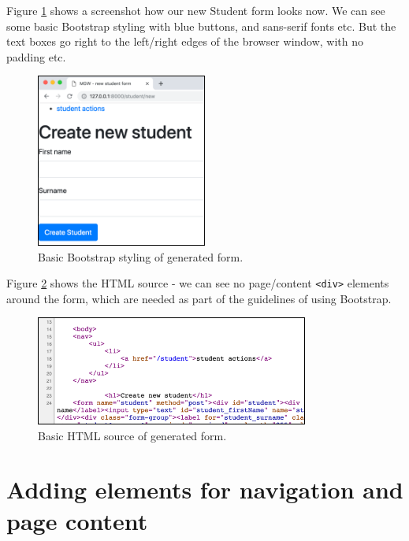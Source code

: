 \documentclass[a4paperpaper,openright]{book}
\begin{document}
Figure \ref{form_bootstrap} shows a screenshot how our new Student form
looks now. We can see some basic Bootstrap styling with blue buttons,
and sans-serif fonts etc. But the text boxes go right to the left/right
edges of the browser window, with no padding etc.

\begin{figure}
\centering
\includegraphics[width=0.5\textwidth,height=\textheight]{./tex2pdf.-8a1528da847c818a/15a6d51f6220970d5520415ccb4864ae58ae9ad9.png}
\caption{Basic Bootstrap styling of generated form.
\label{form_bootstrap}}
\end{figure}

Figure \ref{form_bootstrap_source} shows the HTML source - we can see no
page/content \texttt{\textless{}div\textgreater{}} elements around the
form, which are needed as part of the guidelines of using Bootstrap.

\begin{figure}
\centering
\includegraphics[width=0.8\textwidth,height=\textheight]{./tex2pdf.-8a1528da847c818a/f9087b127b21a746a42bee0755ac2abfb144b89c.png}
\caption{Basic HTML source of generated form.
\label{form_bootstrap_source}}
\end{figure}

\hypertarget{adding-elements-for-navigation-and-page-content}{%
\section{Adding elements for navigation and page
content}\label{adding-elements-for-navigation-and-page-content}}
\end{document}
